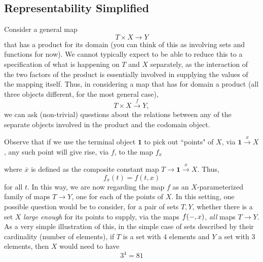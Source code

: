 \documentclass[11pt]{book}
\theoremstyle{definition}
\theoremstyle{definition}
\theoremstyle{definition}
\theoremstyle{theorem}
\theoremstyle{definition}
\begin{document}
\subsection{Representability Simplified} 
Consider a general map   
\begin{equation*}
T \times X \rightarrow Y
\end{equation*}
that has a product for its domain (you can think of this as involving sets and functions for now). We cannot typically expect to be able to reduce this to a specification of what is happening on $T$ and $X$ separately, as the interaction of the two factors of the product is essentially involved in supplying the values of the mapping itself. Thus, in considering a map that has for domain a product (all three objects different, for the most general case), 
\begin{equation*}
T \times X \xrightarrow{f} Y, 
\end{equation*}
we can ask (non-trivial) questions about the relations between any of the separate objects involved in the product and the codomain object.  \par 
Observe that if we use the terminal object $\textbf{1}$ to pick out ``points" of $X$, via 
$\textbf{1} \xrightarrow{x} X$, any such point will give rise, via $f$, to the map $f_x$
\begin{center}
\end{center}  
where $\overline{x}$ is defined as the composite constant map $T \rightarrow \textbf{1} \xrightarrow{x} X$. Thus, 
\begin{equation*}
f_x(t) = f(t, x)
\end{equation*}
for all $t$. In this way, we are now regarding the map $f$ as an $X$-parameterized family of maps $T \rightarrow Y$, one for each of the points of $X$. In this setting, one possible question would be to consider, for a pair of sets $T, Y$, whether there is a set $X$ \textit{large enough} for its points to supply, via the maps $f(\--, x)$, \textit{all} maps $T \rightarrow Y$. As a very simple illustration of this, in the simple case of sets described by their cardinality (number of elements), if $T$ is a set with $4$ elements and $Y$ a set with $3$ elements, then $X$ would need to have 
\begin{equation*}
3^4 = 81
\end{equation*} 
\end{document}
